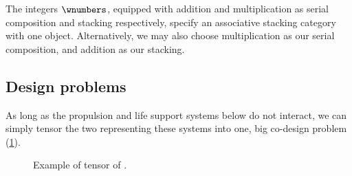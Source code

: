 \begin{example}
    The integers $\wnumbers$, equipped with addition and multiplication as serial composition and stacking respectively, specify an associative stacking category with one object.
    Alternatively, we may also choose multiplication as our serial composition, and addition as our stacking.
\end{example}


\subsection{Design problems}


    \begin{example}
        As long as the propulsion and life support systems below do not interact, we can simply tensor the two  representing these systems into one, big co-design problem (\cref{fig:examplemonoidal}).
        \begin{figure}[h!]
            \centering
            \caption{Example of tensor of . }
            \label{fig:examplemonoidal}
        \end{figure}
    \end{example}



